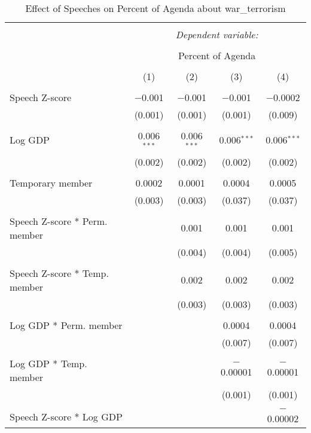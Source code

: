 
\begin{table}[!htbp] \centering 
  \caption{Effect of Speeches on Percent of Agenda about war_terrorism} 
  \label{} 
\begin{tabular}{@{\extracolsep{5pt}}lcccc} 
\\[-1.8ex]\hline 
\hline \\[-1.8ex] 
 & \multicolumn{4}{c}{\textit{Dependent variable:}} \\ 
\cline{2-5} 
\\[-1.8ex] & \multicolumn{4}{c}{Percent of Agenda} \\ 
\\[-1.8ex] & (1) & (2) & (3) & (4)\\ 
\hline \\[-1.8ex] 
 Speech Z-score & $-$0.001 & $-$0.001 & $-$0.001 & $-$0.0002 \\ 
  & (0.001) & (0.001) & (0.001) & (0.009) \\ 
  & & & & \\ 
 Log GDP & 0.006$^{***}$ & 0.006$^{***}$ & 0.006$^{***}$ & 0.006$^{***}$ \\ 
  & (0.002) & (0.002) & (0.002) & (0.002) \\ 
  & & & & \\ 
 Temporary member & 0.0002 & 0.0001 & 0.0004 & 0.0005 \\ 
  & (0.003) & (0.003) & (0.037) & (0.037) \\ 
  & & & & \\ 
 Speech Z-score * Perm. member &  & 0.001 & 0.001 & 0.001 \\ 
  &  & (0.004) & (0.004) & (0.005) \\ 
  & & & & \\ 
 Speech Z-score * Temp. member &  & 0.002 & 0.002 & 0.002 \\ 
  &  & (0.003) & (0.003) & (0.003) \\ 
  & & & & \\ 
 Log GDP * Perm. member &  &  & 0.0004 & 0.0004 \\ 
  &  &  & (0.007) & (0.007) \\ 
  & & & & \\ 
 Log GDP * Temp. member &  &  & $-$0.00001 & $-$0.00001 \\ 
  &  &  & (0.001) & (0.001) \\ 
  & & & & \\ 
 Speech Z-score * Log GDP &  &  &  & $-$0.00002 \\ 

\end{tabular}
\end{table}
